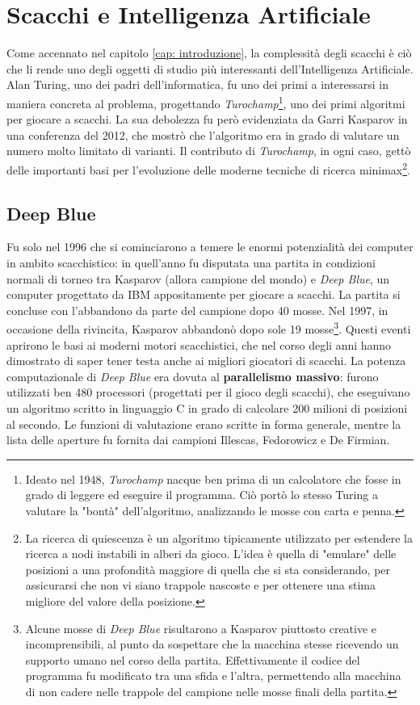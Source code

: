 \section{Scacchi e Intelligenza Artificiale}
Come accennato nel capitolo \ref{cap: introduzione}, la complessità degli scacchi è ciò che li rende uno degli oggetti di studio più interessanti 
dell'Intelligenza Artificiale. Alan Turing, uno dei padri dell'informatica, fu uno dei primi a interessarsi in maniera concreta al problema, progettando 
\textit{Turochamp}\footnote{Ideato nel 1948, \textit{Turochamp} nacque ben prima di un calcolatore che fosse in grado di 
leggere ed eseguire il programma. Ciò portò lo stesso Turing a valutare la "bontà" dell'algoritmo, analizzando le mosse con carta e penna.}, uno dei primi algoritmi per giocare a scacchi\cite{godena2021eterna}.
La sua debolezza fu però evidenziata da Garri Kasparov in una conferenza del 2012, che mostrò che l'algoritmo era 
in grado di valutare un numero molto limitato di varianti\cite{kasparov2017reconstructing}. Il contributo di \textit{Turochamp}, in ogni caso, gettò delle importanti basi 
per l'evoluzione delle moderne tecniche di ricerca minimax\footnote{La ricerca di quiescenza è un algoritmo tipicamente utilizzato per estendere la ricerca a nodi instabili in alberi da gioco. L'idea è quella di "emulare" delle posizioni a una profondità maggiore di quella che si sta considerando, per assicurarsi che non vi siano trappole nascoste e per ottenere una stima migliore del valore della posizione.}.

\subsection{Deep Blue}
Fu solo nel 1996 che si cominciarono a temere le enormi potenzialità dei computer in ambito scacchistico: in quell'anno fu disputata 
una partita in condizioni normali di torneo tra Kasparov (allora campione del mondo) e \textit{Deep Blue}, un computer progettato 
da IBM appositamente per giocare a scacchi. La partita si concluse con l'abbandono da parte del campione dopo 40 mosse. Nel 1997, in occasione della rivincita, 
Kasparov abbandonò dopo sole 19 mosse\footnote{Alcune mosse di \textit{Deep Blue} risultarono a Kasparov piuttosto creative e incomprensibili,
al punto da sospettare che la macchina stesse ricevendo un supporto umano nel corso della partita. Effettivamente il codice del programma 
fu modificato tra una sfida e l'altra, permettendo alla macchina di non cadere nelle trappole del campione nelle mosse finali della partita.}. 
Questi eventi aprirono le basi ai moderni motori scacchistici, che nel corso degli anni hanno dimostrato di saper tener testa anche 
ai migliori giocatori di scacchi\cite{newborn2012kasparov}.
La potenza computazionale di \textit{Deep Blue} era dovuta al \textbf{parallelismo massivo}: furono utilizzati ben 480 processori (progettati per il gioco degli 
scacchi), che eseguivano un algoritmo scritto in linguaggio C in grado di calcolare 200 milioni di posizioni al secondo. Le funzioni di 
valutazione erano scritte in forma generale, mentre la lista delle aperture fu fornita dai campioni Illescas, Fedorowicz e De Firmian.

